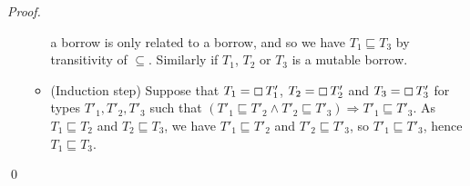\begin{proof}
\begin{itemize}
\begin{itemize}
      a borrow is only related to a borrow, and so we have
      $T_1\sqsubseteq T_3$ by transitivity of $\subseteq$.
      Similarly if $T_1$, $T_2$ or $T_3$ is a mutable borrow.
      \item (Induction step) Suppose that $T_1=\boxempty\,{T'_1}$,
      $T_2=\boxempty\,{T'_2}$ and $T_3=\boxempty\,{T'_3}$ for types
      $T'_1,T'_2,T'_3$ such that
      $(T'_1 \sqsubseteq T'_2 \land T'_2 \sqsubseteq T'_3) \Rightarrow
      T'_1 \sqsubseteq T'_3$.
      As $T_1 \sqsubseteq T_2$ and $T_2 \sqsubseteq T_3$, we have
      $T'_1 \sqsubseteq T'_2$ and $T'_2 \sqsubseteq T'_3$, so
      $T'_1 \sqsubseteq T'_3$, hence $T_1 \sqsubseteq T_3$.
    \end{itemize}
  \end{itemize}
  \qed
\end{proof}


